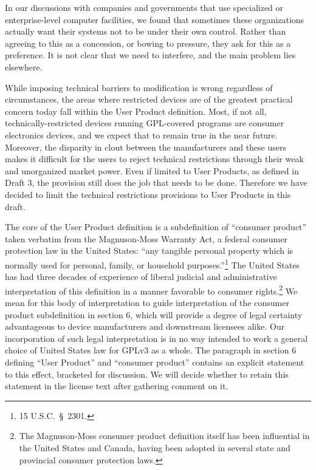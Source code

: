 In our discussions with companies and governments that use specialized
or enterprise-level computer facilities, we found that sometimes these
organizations actually want their systems not to be under their own
control. Rather than agreeing to this as a concession, or bowing to
pressure, they ask for this as a preference. It is not clear that we
need to interfere, and the main problem lies elsewhere. 

While imposing technical barriers to modification is wrong regardless of
circumstances, the areas where restricted devices are of the greatest
practical concern today fall within the User Product definition. Most,
if not all, technically-restricted devices running GPL-covered programs
are consumer electronics devices, and we expect that to remain true in
the near future. Moreover, the disparity in clout between the
manufacturers and these users makes it difficult for the users to reject
technical restrictions through their weak and unorganized market
power. Even if limited to User Products, as defined in Draft 3, the
provision still does the job that needs to be done. Therefore we have
decided to limit the technical restrictions provisions to User Products
in this draft.

The core of the User Product definition is a subdefinition of ``consumer
product'' taken verbatim from the Magnuson-Moss Warranty Act, a federal
consumer protection law in the United States: ``any tangible personal
property which is normally used for personal, family, or household
purposes.''\footnote{15 U.S.C.~\S\ 2301.}  The United States has had
three decades of experience of liberal judicial and administrative
interpretation of this definition in a manner favorable to consumer
rights.\footnote{The Magnuson-Moss consumer product definition itself
has been influential in the United States and Canada, having been
adopted in several state and provincial consumer protection laws.}  We
mean for this body of interpretation to guide interpretation of the
consumer product subdefinition in section 6, which will provide a degree
of legal certainty advantageous to device manufacturers and downstream
licensees alike.  Our incorporation of such legal interpretation is in
no way intended to work a general choice of United States law for GPLv3
as a whole.  The paragraph in section 6 defining ``User Product'' and
``consumer product'' contains an explicit statement to this effect,
bracketed for discussion.  We will decide whether to retain this
statement in the license text after gathering comment on it.

